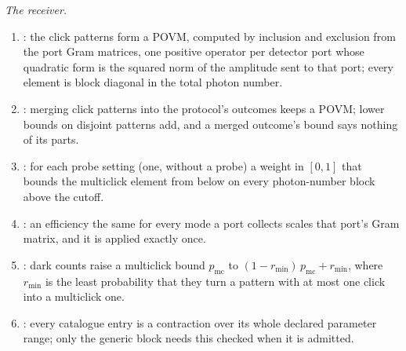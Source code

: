 \noindent\emph{The receiver.}
\begin{enumerate}[resume,itemsep=1pt]
\item {}: the click patterns form a POVM,
  computed by inclusion and exclusion from the port Gram matrices, one
  positive operator per detector port whose quadratic form is the squared norm
  of the amplitude sent to that port; every element is block diagonal in the
  total photon number.
\item {}: merging click patterns into the
  protocol's outcomes keeps a POVM; lower bounds on disjoint patterns add, and
  a merged outcome's bound says nothing of its parts.
\item {}: for each probe setting (one, without
  a probe) a weight in $[0,1]$ that bounds the multiclick element from below
  on every photon-number block above the cutoff.
\item {}: an efficiency the
  same for every mode a port collects scales that port's Gram matrix, and it
  is applied exactly once.
\item {}: dark counts
  raise a multiclick bound $p_{\mathrm{mc}}$ to
  $(1-r_{\min})\,p_{\mathrm{mc}}+r_{\min}$, where $r_{\min}$ is the least
  probability that they turn a pattern with at most one click into a
  multiclick one.
\item {}: every
  catalogue entry is a contraction over its whole declared parameter range;
  only the generic block needs this checked when it is admitted.
\end{enumerate}


